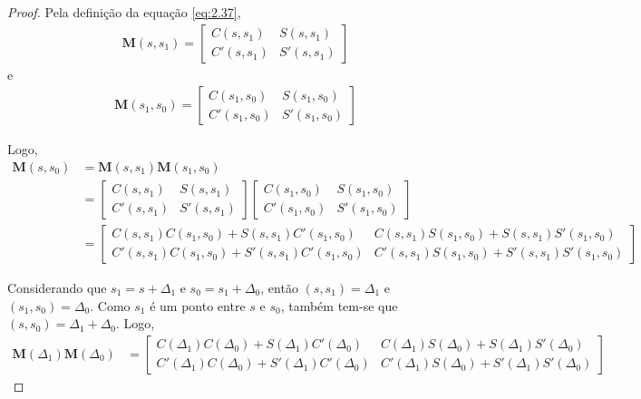 \begin{proof}
	Pela definição da equação \eqref{eq:2.37},
	\begin{align*}
        \boldsymbol{M}(s,s_1) = \begin{bmatrix}
        C(s,s_1) & S(s,s_1)\\
        C'(s,s_1) & S'(s,s_1)
        \end{bmatrix}
	\end{align*} e
    \begin{align*}
		\boldsymbol{M}(s_1,s_0) = \begin{bmatrix}
		C(s_1,s_0) & S(s_1,s_0)\\
		C'(s_1,s_0) & S'(s_1,s_0)
		\end{bmatrix}
	\end{align*}
	
	Logo,
	\begin{align*}
        \boldsymbol{M}(s,s_0) &= \boldsymbol{M}(s,s_1)\boldsymbol{M}(s_1,s_0)\\
        &= \begin{bmatrix}
            C(s,s_1) & S(s,s_1)\\
            C'(s,s_1) & S'(s,s_1)
            \end{bmatrix} \begin{bmatrix}
                               C(s_1,s_0) & S(s_1,s_0)\\
                              C'(s_1,s_0) & S'(s_1,s_0)
                              \end{bmatrix}\\
        &= \begin{bmatrix}
        C(s,s_1)C(s_1,s_0)+S(s,s_1)C'(s_1,s_0) & C(s,s_1)S(s_1,s_0) + S(s,s_1)S'(s_1,s_0)\\
        C'(s,s_1)C(s_1,s_0)+S'(s,s_1)C'(s_1,s_0) & C'(s,s_1)S(s_1,s_0) + S'(s,s_1)S'(s_1,s_0)
        \end{bmatrix}	
	\end{align*}
	
	Considerando que $s_1 = s+\Delta_1$ e $s_0 = s_1 + \Delta_0$, então $(s,s_1) = \Delta_1$ e $(s_1,s_0) = \Delta_0$. Como $s_1$ é um ponto entre $s$ e $s_0$, também tem-se que $(s,s_0) = \Delta_1 + \Delta_0$. Logo, 
	\begin{align*}
        \boldsymbol{M}(\Delta_1)\boldsymbol{M}(\Delta_0) &= \begin{bmatrix}
        C(\Delta_1)C(\Delta_0)+S(\Delta_1)C'(\Delta_0) & C(\Delta_1)S(\Delta_0) + S(\Delta_1)S'(\Delta_0)\\
        C'(\Delta_1)C(\Delta_0)+S'(\Delta_1)C'(\Delta_0) & C'(\Delta_1)S(\Delta_0) + S'(\Delta_1)S'(\Delta_0)
        \end{bmatrix}
	\end{align*}
	

\end{proof}
